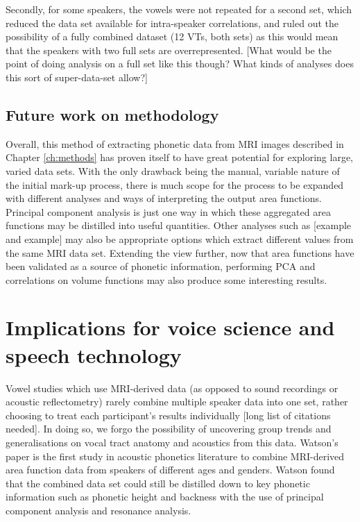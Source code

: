 Secondly, for some speakers, the vowels were not repeated for a second set, which reduced the data set available for intra-speaker correlations, and ruled out the possibility of a fully combined dataset (12 VTs, both sets) as this would mean that the speakers with two full sets are overrepresented. [What would be the point of doing analysis on a full set like this though? What kinds of analyses does this sort of super-data-set allow?]

\subsection{Future work on methodology}

Overall, this method of extracting phonetic data from MRI images described in Chapter  \ref{ch:methods} has proven itself to have great potential for exploring large, varied data sets. With the only drawback being the manual, variable nature of the initial mark-up process, there is much scope for the process to be expanded with different analyses and ways of interpreting the output area functions. Principal component analysis is just one way in which these aggregated area functions may be distilled into useful quantities. Other analyses such as [example and example] may also be appropriate options which extract different values from the same MRI data set. Extending the view further, now that area functions have been validated as a source of phonetic information, performing PCA and correlations on volume functions may also produce some interesting results.

\section{Implications for voice science and speech technology}

Vowel studies which use MRI-derived data (as opposed to sound recordings or acoustic reflectometry) rarely combine multiple speaker data into one set, rather choosing to treat each participant's results individually [long list of citations needed]. In doing so, we forgo the possibility of uncovering group trends and generalisations on vocal tract anatomy and acoustics from this data. Watson's paper \cite{watson2014mappings} is the first study in acoustic phonetics literature to combine MRI-derived area function data from speakers of different ages and genders. Watson found that the combined data set could still be distilled down to key phonetic information such as phonetic height and backness with the use of principal component analysis and resonance analysis. 

